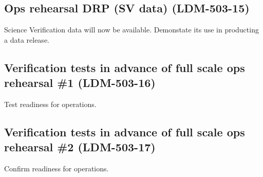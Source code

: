 \subsection{Ops rehearsal DRP (SV data) \textbf{(LDM-503-15)}\label{LDM-503-15}}
Science Verification data will now be available. Demonstate its use in producting a data release.
 \newline

\subsection{Verification tests in advance of full scale ops rehearsal \#1 \textbf{(LDM-503-16)}\label{LDM-503-16}}
Test readiness for operations.
 \newline

\subsection{Verification tests in advance of full scale ops rehearsal \#2 \textbf{(LDM-503-17)}\label{LDM-503-17}}
Confirm readiness for operations.
 \newline

